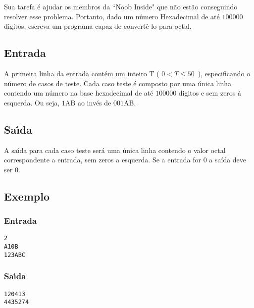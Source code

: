 \documentclass[14pt]{article}
\begin{document}
Sua tarefa \'e ajudar os membros da ``Noob Inside" que n\~ao est\~ao conseguindo resolver esse problema. Portanto, dado um n\'umero Hexadecimal de at\'e $100000$ digitos, escreva um programa capaz de convert\^e-lo para octal.

\subsection{Entrada}
A primeira linha da entrada cont\'em um inteiro T ( $0 < T \leqslant 50$\ ), especificando o n\'umero de casos de teste. Cada caso teste \'e composto por uma \'unica linha contendo um n\'umero na base hexadecimal de at\'e $100000$ digitos e sem zeros \`a esquerda. Ou seja, $1$AB ao inv\'es de $001$AB.


\subsection{Sa\'{\i}da}
A sa\'{\i}da para cada caso teste ser\'a uma \'unica linha contendo o valor octal correspondente a entrada, sem zeros a esquerda. Se a entrada for $0$ a sa\'ida deve ser $0$.

\subsection{Exemplo}
\subsubsection{Entrada}
\begin{verbatim}
2
A10B
123ABC
 \end{verbatim}
\subsubsection{Sa\'{\i}da}
 \begin{verbatim}
120413
4435274
 \end{verbatim}
\end{document}
